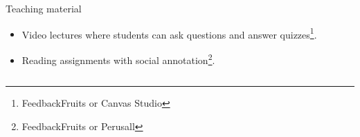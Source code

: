 \begin{frame}
  \begin{columns}
    \begin{column}{0.5\columnwidth}
      \begin{block}{Teaching material}
        \begin{itemize}
          \item<1> Video lectures where students can ask questions and answer 
            quizzes\footnote{FeedbackFruits or Canvas Studio}.

            \pause

          \item<2-3> Reading assignments with social annotation\footnote{%
              FeedbackFruits or Perusall
            }.
        \end{itemize}
      \end{block}
    \end{column}
    \begin{column}{0.5\columnwidth}
\end{column}
\end{columns}
\end{frame}
